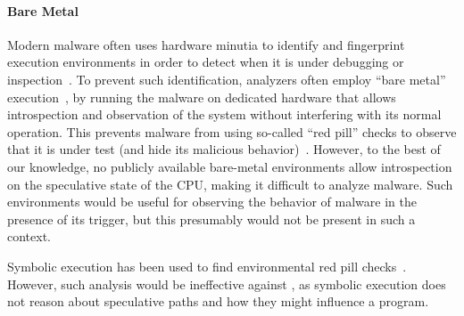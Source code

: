 \paragraph{Bare Metal}
Modern malware often uses hardware minutia to identify and fingerprint execution
environments in order to detect when it is under debugging or
inspection~\cite{lindorfer2011detecting,balzarotti2010efficient,paleari2009fistful}.
To prevent such identification, analyzers often employ ``bare metal''
execution~\cite{kirat2011barebox}, by running the malware on
dedicated hardware that allows introspection and observation of the system
without interfering with its normal operation. This prevents malware from using
so-called ``red pill'' checks to observe that it is under test (and hide its
malicious behavior)~\cite{kirat2014barecloud}. However, to the best of our
knowledge, no publicly available bare-metal environments allow introspection on
the speculative state of the CPU, making it difficult to analyze \speculake
malware. Such environments would be useful for observing the behavior of
\speculake malware in the presence of its trigger, but this presumably would not be
present in such a context.

Symbolic execution has been used to find
environmental red pill checks~\cite{schwartz2010all}. However, such analysis
would be ineffective against \speculake, as symbolic execution does not reason
about speculative paths and how they might influence a program.

%
%


